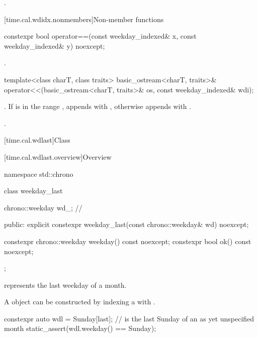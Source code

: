\begin{itemdescr}
\pnum
\returns {}.
\end{itemdescr}

[time.cal.wdidx.nonmembers]{Non-member functions}

%
\begin{itemdecl}
constexpr bool operator==(const weekday_indexed& x, const weekday_indexed& y) noexcept;
\end{itemdecl}

\begin{itemdescr}
\pnum
\returns {}.
\end{itemdescr}

%
\begin{itemdecl}
template<class charT, class traits>
  basic_ostream<charT, traits>&
    operator<<(basic_ostream<charT, traits>& os, const weekday_indexed& wdi);
\end{itemdecl}

\begin{itemdescr}
\pnum
\effects
\tcode{os << wdi.weekday() << '[' << wdi.index()}.
If  is in the range ,
appends with \tcode{']'},
otherwise
appends with \tcode{" is not a valid index]"}.

\pnum
\returns {}.
\end{itemdescr}

[time.cal.wdlast]{Class }

[time.cal.wdlast.overview]{Overview}

\begin{codeblock}
namespace std::chrono {
  class weekday_last {
    chrono::weekday wd_;                // \expos

    public:
    explicit constexpr weekday_last(const chrono::weekday& wd) noexcept;

    constexpr chrono::weekday weekday() const noexcept;
    constexpr bool ok() const noexcept;
  };
}
\end{codeblock}

\pnum
{} represents the last weekday of a month.

\pnum
\begin{note}
A  object
can be constructed by indexing a  with .
\end{note}
\begin{example}
\begin{codeblock}
constexpr auto wdl = Sunday[last];      //  is the last Sunday of an as yet unspecified month
static_assert(wdl.weekday() == Sunday);
\end{codeblock}
\end{example}


